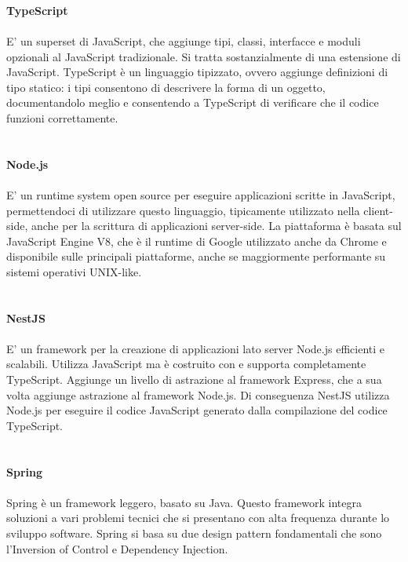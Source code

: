 \\\\\\
\textbf{TypeScript}
\\\\
E' un superset di JavaScript, che aggiunge tipi, classi, interfacce e moduli opzionali al JavaScript 
tradizionale. Si tratta sostanzialmente di una estensione di JavaScript.
TypeScript è un linguaggio tipizzato, ovvero aggiunge definizioni di tipo statico: i tipi consentono di 
descrivere la forma di un oggetto, documentandolo meglio e consentendo a TypeScript di verificare che 
il codice funzioni correttamente.
\\\\\\
\clearpage
\leavevmode\newline
\textbf{Node.js}
\\\\
E' un runtime system open source per eseguire applicazioni scritte in JavaScript, permettendoci di utilizzare questo 
linguaggio, tipicamente utilizzato nella client-side, anche per la scrittura di applicazioni server-side.
La piattaforma è basata sul JavaScript Engine V8, che è il runtime di Google utilizzato anche da Chrome e 
disponibile sulle principali piattaforme, anche se maggiormente performante su sistemi operativi UNIX-like.
\\\\\\
\textbf{NestJS}
\\\\
E' un framework per la creazione di applicazioni lato server Node.js efficienti e scalabili. 
Utilizza JavaScript ma è costruito con e supporta completamente TypeScript. Aggiunge un livello di astrazione
al framework Express, che a sua volta aggiunge astrazione al framework Node.js. Di conseguenza NestJS 
utilizza Node.js per eseguire il codice JavaScript generato dalla compilazione del codice TypeScript.
\\\\\\
\textbf{Spring}
\\\\
Spring è un framework leggero, basato su Java. Questo framework integra soluzioni a vari problemi tecnici
che si presentano con alta frequenza durante lo sviluppo software. Spring si basa su due design pattern
fondamentali che sono l'Inversion of Control e Dependency Injection.
\\\\\\
